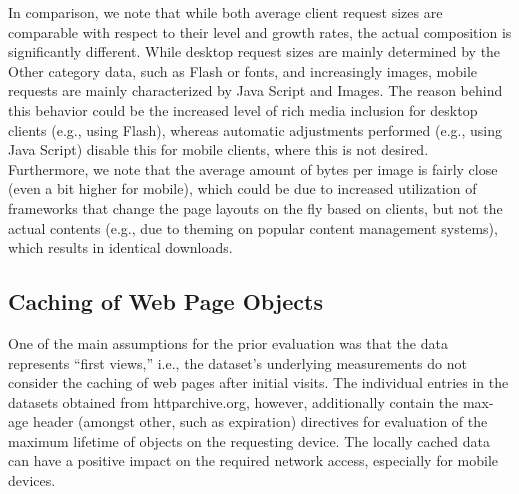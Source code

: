 \documentclass[onecolumn,12pt]{IEEEtran}
\begin{document}
In comparison, we note that while both average client request sizes are comparable with respect to their level and growth rates, the actual composition is significantly different. 
While desktop request sizes are mainly determined by the Other category data, such as Flash or fonts, and increasingly images, mobile requests are mainly characterized by Java Script and Images.
The reason behind this behavior could be the increased level of rich media inclusion for desktop clients (e.g., using Flash), whereas automatic adjustments performed (e.g., using Java Script) disable this for mobile clients, where this is not desired. Furthermore, we note that the average amount of bytes per image is fairly close (even a bit higher for mobile), which could be due to increased utilization of frameworks that change the page layouts on the fly based on clients, but not the actual contents (e.g., due to theming on popular content management systems), which results in identical downloads.

\subsection{Caching of Web Page Objects}
One of the main assumptions for the prior evaluation was that the data represents ``first views,'' i.e., the dataset's underlying measurements do not consider the caching of web pages after initial visits. 
The individual entries in the datasets obtained from httparchive.org, however, additionally contain the max-age header (amongst other, such as expiration) directives for evaluation of the maximum lifetime of objects on the requesting device. The locally cached data can have a positive impact on the required network access, especially for mobile devices.
\end{document}
